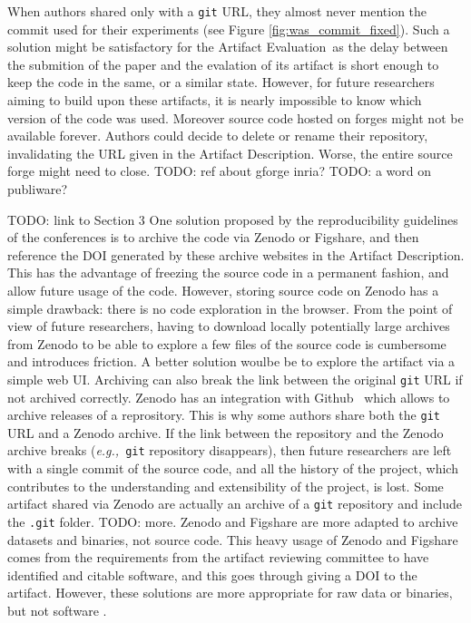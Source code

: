 \documentclass[sigconf,natbib=false]{acmart}
\newcommand{\eg}{\emph{e.g.,}}
\newcommand{\ad}{Artifact Description}
\newcommand{\aeval}{Artifact Evaluation}
\newcommand{\todo}[1]{{\color{red}TODO: #1}}
\begin{document}
When authors shared only with a \texttt{git} URL, they almost never mention the commit used for their experiments (see Figure \ref{fig:was_commit_fixed}).
Such a solution might be satisfactory for the \aeval\ as the delay between the submition of the paper and the evalation of its artifact is short enough to keep the code in the same, or a similar state.
However, for future researchers aiming to build upon these artifacts, it is nearly impossible to know which version of the code was used.
Moreover source code hosted on forges might not be available forever.
Authors could decide to delete or rename their repository, invalidating the URL given in the \ad.
Worse, the entire source forge might need to close. \todo{ref about gforge inria?}
\todo{a word on publiware?}

\todo{link to Section 3}
One solution proposed by the reproducibility guidelines of the conferences is to archive the code via Zenodo or Figshare, and then reference the DOI generated by these archive websites in the \ad.
This has the advantage of freezing the source code in a permanent fashion, and allow future usage of the code.
However, storing source code on Zenodo has a simple drawback: there is no code exploration in the browser.
From the point of view of future researchers, having to download locally potentially large archives from Zenodo to be able to explore a few files of the source code is cumbersome and introduces friction.
A better solution woulbe be to explore the artifact via a simple web UI.
Archiving can also break the link between the original \texttt{git} URL if not archived correctly.
Zenodo has an integration with Github\ \cite{github_zenodo} which allows to archive releases of a reprository.
This is why some authors share both the \texttt{git} URL and a Zenodo archive.
If the link between the repository and the Zenodo archive breaks (\eg\ \texttt{git} repository disappears), then future researchers are left with a single commit of the source code, and all the history of the project, which contributes to the understanding and extensibility of the project, is lost.
Some artifact shared via Zenodo are actually an archive of a \texttt{git} repository and include the \texttt{.git} folder.
\todo{more.}
Zenodo and Figshare are more adapted to archive datasets and binaries, not source code.
This heavy usage of Zenodo and Figshare comes from the requirements from the artifact reviewing committee to have identified and citable software, and this goes through giving a DOI to the artifact.
However, these solutions are more appropriate for raw data or binaries, but not software \cite{alliez2019attributing}.
\end{document}

